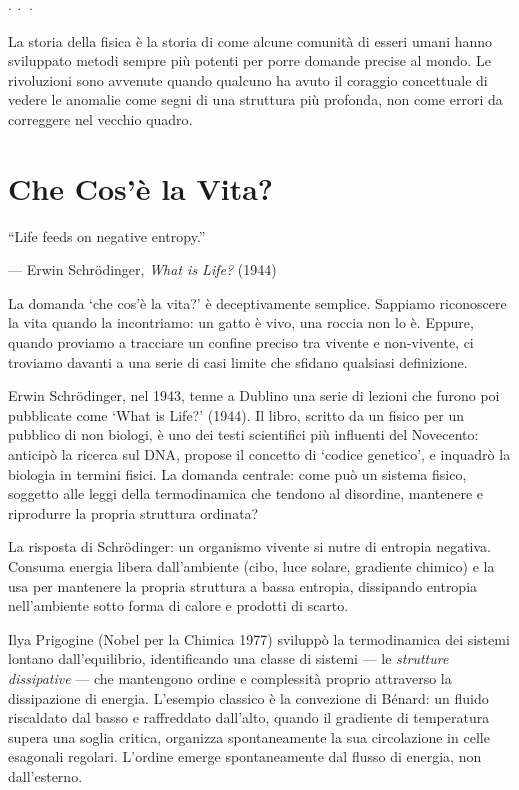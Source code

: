 \documentclass[12pt,a4paper,openany]{book}
\newcommand{\sezione}[1]{\vspace{1.2em}{\large\bfseries #1}\vspace{0.5em}\par}
\newcommand{\puntini}{\begin{center}$\cdot\ \cdot\ \cdot$\end{center}\vspace{0.3em}}
\begin{document}
\puntini

La storia della fisica è la storia di come alcune comunità di esseri umani hanno sviluppato metodi sempre più potenti per porre domande precise al mondo. Le rivoluzioni sono avvenute quando qualcuno ha avuto il coraggio concettuale di vedere le anomalie come segni di una struttura più profonda, non come errori da correggere nel vecchio quadro.

\chapter{Che Cos'è la Vita?}

\epigraph{``Life feeds on negative entropy.''}{--- Erwin Schrödinger, \textit{What is Life?} (1944)}

\sezione{La domanda più semplice e più difficile}

La domanda `che cos'è la vita?' è deceptivamente semplice. Sappiamo riconoscere la vita quando la incontriamo: un gatto è vivo, una roccia non lo è. Eppure, quando proviamo a tracciare un confine preciso tra vivente e non-vivente, ci troviamo davanti a una serie di casi limite che sfidano qualsiasi definizione.

Erwin Schrödinger, nel 1943, tenne a Dublino una serie di lezioni che furono poi pubblicate come `What is Life?' (1944). Il libro, scritto da un fisico per un pubblico di non biologi, è uno dei testi scientifici più influenti del Novecento: anticipò la ricerca sul DNA, propose il concetto di `codice genetico', e inquadrò la biologia in termini fisici. La domanda centrale: come può un sistema fisico, soggetto alle leggi della termodinamica che tendono al disordine, mantenere e riprodurre la propria struttura ordinata?

\sezione{La risposta termodinamica: strutture dissipative}

La risposta di Schrödinger: un organismo vivente si nutre di entropia negativa. Consuma energia libera dall'ambiente (cibo, luce solare, gradiente chimico) e la usa per mantenere la propria struttura a bassa entropia, dissipando entropia nell'ambiente sotto forma di calore e prodotti di scarto.

Ilya Prigogine (Nobel per la Chimica 1977) sviluppò la termodinamica dei sistemi lontano dall'equilibrio, identificando una classe di sistemi --- le \textit{strutture dissipative} --- che mantengono ordine e complessità proprio attraverso la dissipazione di energia. L'esempio classico è la convezione di Bénard: un fluido riscaldato dal basso e raffreddato dall'alto, quando il gradiente di temperatura supera una soglia critica, organizza spontaneamente la sua circolazione in celle esagonali regolari. L'ordine emerge spontaneamente dal flusso di energia, non dall'esterno.
\end{document}
